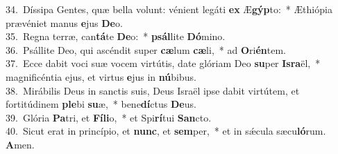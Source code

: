 {34.~}Díssipa Gentes, quæ bella volunt: vénient legáti \textbf{ex} Æ\textbf{gýp}to:~* Æthiópia prævéniet manus \textbf{e}jus \textbf{De}o.\\
{35.~}Regna terræ, can\textbf{tá}te \textbf{De}o:~* \textbf{psál}lite \textbf{Dó}mino.\\
{36.~}Psállite Deo, qui ascéndit super \textbf{cæ}lum \textbf{cæ}li,~* ad \textbf{O}ri\textbf{én}tem.\\
{37.~}Ecce dabit voci suæ vocem virtútis, date glóriam Deo \textbf{su}per \textbf{Is}\textbf{ra}ël,~* magnificéntia ejus, et virtus \textbf{e}jus in \textbf{nú}bibus.\\
{38.~}Mirábilis Deus in sanctis suis, Deus Israël ipse dabit virtútem, et fortitúdinem \textbf{ple}bi \textbf{su}æ,~* bene\textbf{dí}ctus \textbf{De}us.\\
{39.~}Glória \textbf{Pa}tri, et \textbf{Fí}\textbf{li}o,~* et Spi\textbf{rí}tui \textbf{San}cto.\\
{40.~}Sicut erat in princípio, et \textbf{nunc}, et \textbf{sem}per,~* et in sǽcula sæcu\textbf{ló}rum. \textbf{A}men.\\
